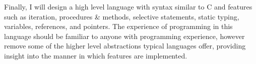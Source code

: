 Finally, I will design a high level language with syntax similar to C and features such as iteration, procedures \& methods, selective statements, static typing, variables, references, and pointers. The experience of programming in this language should be familiar to anyone with programming experience, however remove some of the higher level abstractions typical languages offer, providing insight into the manner in which features are implemented. 



\newpage

\newpage



\newpage
